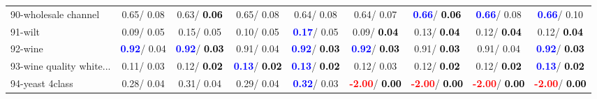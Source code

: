 \begin{table}[h]
\begin{center}
\begin{tabular}{lc|c|c|c|c|c|c|c}
90-wholesale channel &   0.65/  0.08 &   0.63/\textcolor{black}{\textbf{  0.06}} &   0.65/  0.08 &   0.64/  0.08 &   0.64/  0.07 & \textcolor{blue}{\textbf{  0.66}}/\textcolor{black}{\textbf{  0.06}} & \textcolor{blue}{\textbf{  0.66}}/  0.08 & \textcolor{blue}{\textbf{  0.66}}/  0.10 \\
91-wilt &   0.09/  0.05 &   0.15/  0.05 &   0.10/  0.05 & \textcolor{blue}{\textbf{  0.17}}/  0.05 &   0.09/\textcolor{black}{\textbf{  0.04}} &   0.13/\textcolor{black}{\textbf{  0.04}} &   0.12/\textcolor{black}{\textbf{  0.04}} &   0.12/\textcolor{black}{\textbf{  0.04}} \\
92-wine & \textcolor{blue}{\textbf{  0.92}}/  0.04 & \textcolor{blue}{\textbf{  0.92}}/\textcolor{black}{\textbf{  0.03}} &   0.91/  0.04 & \textcolor{blue}{\textbf{  0.92}}/\textcolor{black}{\textbf{  0.03}} & \textcolor{blue}{\textbf{  0.92}}/\textcolor{black}{\textbf{  0.03}} &   0.91/\textcolor{black}{\textbf{  0.03}} &   0.91/  0.04 & \textcolor{blue}{\textbf{  0.92}}/\textcolor{black}{\textbf{  0.03}} \\ \hline
93-wine quality white... &   0.11/  0.03 &   0.12/\textcolor{black}{\textbf{  0.02}} & \textcolor{blue}{\textbf{  0.13}}/\textcolor{black}{\textbf{  0.02}} & \textcolor{blue}{\textbf{  0.13}}/\textcolor{black}{\textbf{  0.02}} &   0.12/  0.03 &   0.12/\textcolor{black}{\textbf{  0.02}} &   0.12/\textcolor{black}{\textbf{  0.02}} & \textcolor{blue}{\textbf{  0.13}}/\textcolor{black}{\textbf{  0.02}} \\
94-yeast 4class &   0.28/  0.04 &   0.31/  0.04 &   0.29/  0.04 & \textcolor{blue}{\textbf{  0.32}}/  0.03 & \textcolor{red}{\textbf{ -2.00}}/\textcolor{black}{\textbf{  0.00}} & \textcolor{red}{\textbf{ -2.00}}/\textcolor{black}{\textbf{  0.00}} & \textcolor{red}{\textbf{ -2.00}}/\textcolor{black}{\textbf{  0.00}} & \textcolor{red}{\textbf{ -2.00}}/\textcolor{black}{\textbf{  0.00}} \\\end{tabular}\label{stratsALCKappa2b5NN}
\end{center}
\end{table}